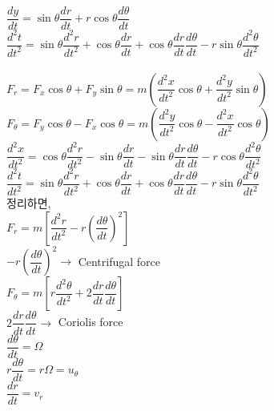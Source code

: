 \documentclass[a4paper]{article}
\begin{document}
$\dfrac{dy}{dt} = \sin \theta \dfrac{dr}{dt} + r \cos \theta \dfrac{d\theta}{dt}$ \\

$\dfrac{d^{2}t}{dt^{2}} = \sin \theta \dfrac{d^{2}r}{dt^{2}} + \cos \theta \dfrac{dr}{dt} + \cos \theta \dfrac{dr}{dt} \dfrac{d\theta}{dt} -r \sin \theta \dfrac{d^{2}\theta}{dt^{2}}$\\
\\



$ F_{r} = F_{x} \cos \theta + F_{y} \sin \theta 
= m \left ( \dfrac{d^{2}x}{dt^{2}} \cos \theta + \dfrac{d^{2}y}{dt^{2}} \sin \theta \right) $\\

$ F_{\theta} = F_{y} \cos \theta - F_{x} \cos \theta 
= m \left ( \dfrac{d^{2}y}{dt^{2}} \cos \theta - \dfrac{d^{2}x}{dt^{2}} \cos \theta \right) $\\

$\dfrac{d^{2}x}{dt^{2}} = \cos \theta \dfrac{d^{2}r}{dt^{2}} - \sin \theta \dfrac{dr}{dt} - \sin \theta \dfrac{dr}{dt} \dfrac{d\theta}{dt} -r \cos \theta \dfrac{d^{2}\theta}{dt^{2}}$\\

$\dfrac{d^{2}t}{dt^{2}} = \sin \theta \dfrac{d^{2}r}{dt^{2}} + \cos \theta \dfrac{dr}{dt} + \cos \theta \dfrac{dr}{dt} \dfrac{d\theta}{dt} -r \sin \theta \dfrac{d^{2}\theta}{dt^{2}}$\\


정리하면, \\

$ F_{r} = m \left[ \dfrac{d^{2}r}{dt^{2}} - r \left( {\dfrac{d \theta}{dt}} \right)^{2} \right] $\\

$ -r \left( {\dfrac{d \theta}{dt}} \right)^{2} \rightarrow $ Centrifugal force \\

$ F_{\theta} = m \left[ r \dfrac{d^{2}\theta}{dt^{2}} + 2 \dfrac{dr}{dt} \dfrac{d\theta}{dt}  \right] $\\

$ 2 \dfrac{dr}{dt} \dfrac{d\theta}{dt} \rightarrow $ Coriolis force \\



$\dfrac{d \theta}{dt} = \Omega $\\

$ r\dfrac{d \theta}{dt} = r \Omega = u_{\theta} $\\

$\dfrac{dr}{dt} = v_{r}$\\
\end{document}
